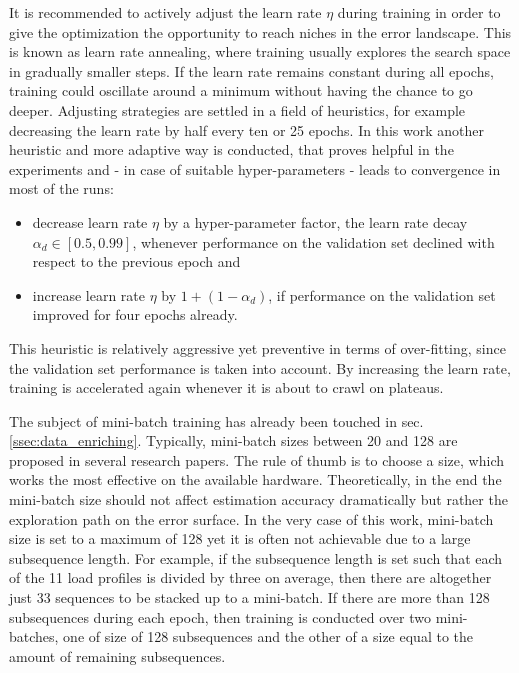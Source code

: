 It is recommended to actively adjust the learn rate $\eta$ during training in order to give the optimization the opportunity to reach niches in the error landscape.
This is known as learn rate annealing, where training usually explores the search space in gradually smaller steps.
If the learn rate remains constant during all epochs, training could oscillate around a minimum without having the chance to go deeper.
Adjusting strategies are settled in a field of heuristics, for example decreasing the learn rate by half every ten or 25 epochs.
In this work another heuristic and more adaptive way is conducted, that proves helpful in the experiments and - in case of suitable hyper-parameters - leads to convergence in most of the runs:
\begin{itemize}
	\item decrease learn rate $\eta$ by a hyper-parameter factor, the learn rate decay $\alpha_d\in{[0.5, 0.99]}$, whenever performance on the validation set declined with respect to the previous epoch and
	\item increase learn rate $\eta$ by $1 + (1 - \alpha_d)$, if performance on the validation set improved for four epochs already.
\end{itemize}
This heuristic is relatively aggressive yet preventive in terms of over-fitting, since the validation set performance is taken into account.
By increasing the learn rate, training is accelerated again whenever it is about to crawl on plateaus.

The subject of mini-batch training has already been touched in sec. \ref{ssec:data_enriching}.
Typically, mini-batch sizes between 20 and 128 are proposed in several research papers.
The rule of thumb is to choose a size, which works the most effective on the available hardware.
Theoretically, in the end the mini-batch size should not affect estimation accuracy dramatically but rather the exploration path on the error surface.
In the very case of this work, mini-batch size is set to a maximum of 128 yet it is often not achievable due to a large subsequence length.
For example, if the subsequence length is set such that each of the 11 load profiles is divided by three on average, then there are altogether just 33 sequences to be stacked up to a mini-batch.
If there are more than 128 subsequences during each epoch, then training is conducted over two mini-batches, one of size of 128 subsequences and the other of a size equal to the amount of remaining subsequences.

